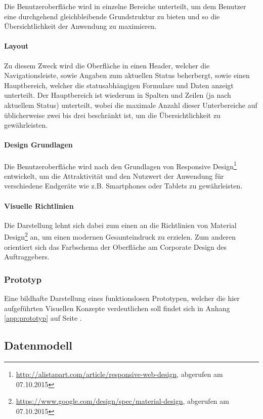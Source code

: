 \documentclass[12pt, xcolor=dvipsnames]{scrartcl}
\begin{document}
Die Benutzeroberfläche wird in einzelne Bereiche unterteilt, um dem Benutzer eine durchgehend gleichbleibende Grundstruktur zu bieten und so die Übersichtlichkeit der Anwendung zu maximieren.

\paragraph{Layout}
Zu diesem Zweck wird die Oberfläche in einen Header, welcher die Navigationsleiste, sowie Angaben zum aktuellen Status beherbergt, sowie einen Hauptbereich, welcher die statusabhängigen Formulare und Daten anzeigt unterteilt. Der Hauptbereich ist wiederum in Spalten und Zeilen (ja nach aktuellem Status) unterteilt, wobei die maximale Anzahl dieser Unterbereiche auf üblicherweise zwei bis drei beschränkt ist, um die Übersichtlichkeit zu gewährleisten.

\paragraph{Design Grundlagen}
Die Benutzeroberfläche wird nach den Grundlagen von
Responsive Design\footnote{\url{http://alistapart.com/article/responsive-web-design}, abgerufen am 07.10.2015}
entwickelt, um die Attraktivität und den Nutzwert der Anwendung für verschiedene Endgeräte wie z.B. Smartphones oder Tablets zu gewährleisten.

\paragraph{Visuelle Richtlinien}

Die Darstellung lehnt sich dabei zum einen an die Richtlinien von
Material Design\footnote{\url{https://www.google.com/design/spec/material-design}, abgerufen am 07.10.2015} an, um einen modernen Gesamteindruck zu erzielen.
Zum anderen orientiert sich das Farbschema der Oberfläche am Corporate Design des Auftraggebers.

\subsubsection{Prototyp}
Eine bildhafte Darstellung eines funktionslosen Prototypen, welcher die hier aufgeführten Visuellen Konzepte verdeutlichen soll findet sich in Anhang \ref{app:prototyp} auf Seite \pageref{app:prototyp}.

\subsection{Datenmodell}
\label{sec:datenmodell}
\end{document}
